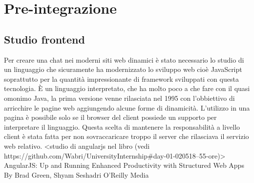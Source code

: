 \chapter{Pre-integrazione}

\section{Studio frontend}
Per creare una chat nei moderni siti web dinamici è stato necessario lo studio di un linguaggio che sicuramente ha modernizzato lo sviluppo web cioè JavaScript soprattutto per la quantità impressionante di framework sviluppati con questa tecnologia.
È un linguaggio interpretato, che ha molto poco a che fare con il quasi omonimo Java, la prima versione venne rilasciata nel 1995 con l'obbiettivo di arricchire le pagine web aggiungendo alcune forme di dinamicità. L'utilizzo in una pagina è possibile solo se il browser del client possiede un supporto per interpretare il linguaggio. Questa scelta di mantenere la responsabilità a livello client è stata fatta per non sovraccaricare troppo il server che rilasciava il servizio web relativo.
\iffalse
<studio di angularjs nel libro (vedi https://github.com/Wabri/UniversityInternship#day-01-020518--55-ore)>
AngularJS: Up and Running
Enhanced Productivity with Structured Web Apps
By Brad Green, Shyam Seshadri
O'Reilly Media

